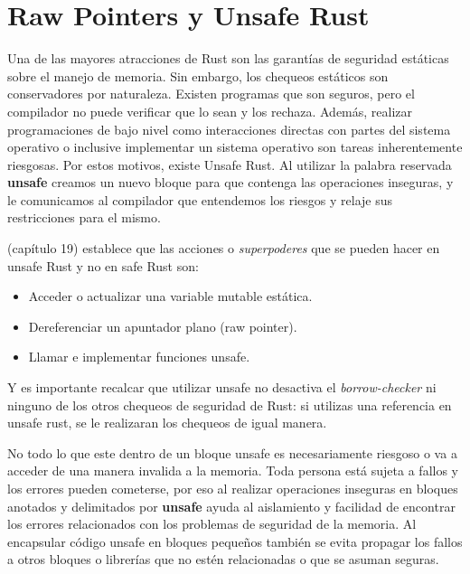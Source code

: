 \section{Raw Pointers y Unsafe Rust}

Una de las mayores atracciones de Rust son las garantías de seguridad estáticas sobre el manejo de memoria. Sin embargo, los chequeos estáticos son conservadores por naturaleza. Existen programas que son seguros, pero el compilador no puede verificar que lo sean y los rechaza. Además, realizar programaciones de bajo nivel como interacciones directas con partes del sistema operativo o inclusive implementar un sistema operativo son tareas inherentemente riesgosas. Por estos motivos, existe Unsafe Rust. Al utilizar la palabra reservada \textbf{unsafe} creamos un nuevo bloque para que contenga las operaciones inseguras, y le comunicamos al compilador que entendemos los riesgos y relaje sus restricciones para el mismo.

\cite{rustbook} (capítulo 19) establece que las acciones o \textit{superpoderes} que se pueden hacer en unsafe Rust y no en safe Rust son:
\begin{itemize}
    \item Acceder o actualizar una variable mutable estática.
    \item Dereferenciar un apuntador plano (raw pointer).
    \item Llamar e implementar funciones unsafe.
\end{itemize}
Y es importante recalcar que utilizar unsafe no desactiva el \textit{borrow-checker} ni ninguno de los otros chequeos de seguridad de Rust: si utilizas una referencia en unsafe rust, se le realizaran los chequeos de igual manera.

No todo lo que este dentro de un bloque unsafe es necesariamente riesgoso o va a acceder de una manera invalida a la memoria. Toda persona está sujeta a fallos y los errores pueden cometerse, por eso al realizar operaciones inseguras en bloques anotados y delimitados por \textbf{unsafe} ayuda al aislamiento y facilidad de encontrar los errores relacionados con los problemas de seguridad de la memoria. Al encapsular código unsafe en bloques pequeños también se evita propagar los fallos a otros bloques o librerías que no estén relacionadas o que se asuman seguras.

